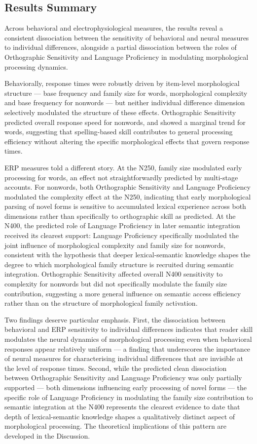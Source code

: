 \documentclass[utf8]{FrontiersinHarvard} %
\begin{document}
\subsection{Results Summary}
Across behavioral and electrophysiological measures, the results reveal a consistent dissociation between the sensitivity of behavioral and neural measures to individual differences, alongside a partial dissociation between the roles of Orthographic Sensitivity and Language Proficiency in modulating morphological processing dynamics.

Behaviorally, response times were robustly driven by item-level morphological structure — base frequency and family size for words, morphological complexity and base frequency for nonwords — but neither individual difference dimension selectively modulated the structure of these effects. Orthographic Sensitivity predicted overall response speed for nonwords, and showed a marginal trend for words, suggesting that spelling-based skill contributes to general processing efficiency without altering the specific morphological effects that govern response times.

ERP measures told a different story. At the N250, family size modulated early processing for words, an effect not straightforwardly predicted by multi-stage accounts. For nonwords, both Orthographic Sensitivity and Language Proficiency modulated the complexity effect at the N250, indicating that early morphological parsing of novel forms is sensitive to accumulated lexical experience across both dimensions rather than specifically to orthographic skill as predicted. At the N400, the predicted role of Language Proficiency in later semantic integration received its clearest support: Language Proficiency specifically modulated the joint influence of morphological complexity and family size for nonwords, consistent with the hypothesis that deeper lexical-semantic knowledge shapes the degree to which morphological family structure is recruited during semantic integration. Orthographic Sensitivity affected overall N400 sensitivity to complexity for nonwords but did not specifically modulate the family size contribution, suggesting a more general influence on semantic access efficiency rather than on the structure of morphological family activation.

Two findings deserve particular emphasis. First, the dissociation between behavioral and ERP sensitivity to individual differences indicates that reader skill modulates the neural dynamics of morphological processing even when behavioral responses appear relatively uniform — a finding that underscores the importance of neural measures for characterising individual differences that are invisible at the level of response times. Second, while the predicted clean dissociation between Orthographic Sensitivity and Language Proficiency was only partially supported — both dimensions influencing early processing of novel forms — the specific role of Language Proficiency in modulating the family size contribution to semantic integration at the N400 represents the clearest evidence to date that depth of lexical-semantic knowledge shapes a qualitatively distinct aspect of morphological processing. The theoretical implications of this pattern are developed in the Discussion.
\end{document}
